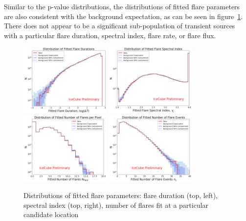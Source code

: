 Similar to the p-value distributions, the distributions of fitted flare parameters are also consistent with the background expectation, as can be seen in figure~\ref{fig:fitparamdists}. There does not appear to be a significant sub-population of transient sources with a particular flare duration, spectral index, flare rate, or flare flux. 

\begin{figure}[h]
\centering
\includegraphics[width=0.4\textwidth]{figs/fitted_flare_durations.png}
\includegraphics[width=0.4\textwidth]{figs/fitted_flare_gamma.png}
\includegraphics[width=0.4\textwidth]{figs/fitted_flare_Nflare.png}
\includegraphics[width=0.4\textwidth]{figs/fitted_flare_ns.png}
\caption{Distributions of fitted flare parameters: flare duration (top, left), spectral index (top, right), number of flares fit at a particular candidate location}
\label{fig:fitparamdists}
\end{figure}

